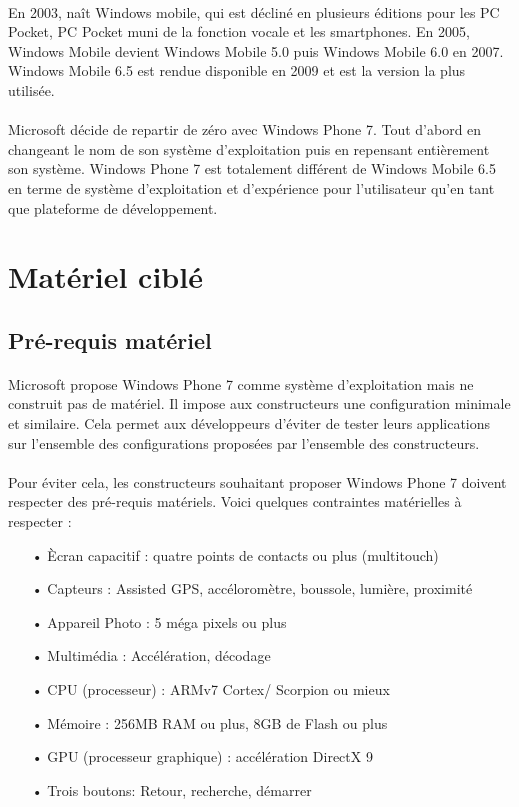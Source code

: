 \documentclass[twoside,UTF8]{EPURapport}
\begin{document}
\paragraph{}
En 2003, naît Windows mobile, qui est décliné en plusieurs éditions pour les PC Pocket, PC Pocket muni de la fonction vocale et les smartphones. En 2005, Windows Mobile devient Windows Mobile 5.0 puis Windows Mobile 6.0 en 2007. Windows Mobile 6.5 est rendue disponible en 2009 et est la version la plus utilisée. 

\paragraph{}
Microsoft décide de repartir de zéro avec Windows Phone 7. Tout d'abord en changeant le nom de son système d'exploitation puis en repensant entièrement son système. Windows Phone 7 est totalement différent de Windows Mobile 6.5 en terme de système d'exploitation et d'expérience pour l'utilisateur qu'en tant que plateforme de développement. 
 

\section{Matériel ciblé}
	\subsection{Pré-requis matériel}
\paragraph{}
Microsoft propose Windows Phone 7 comme système d'exploitation mais ne construit pas de matériel. Il impose aux constructeurs une configuration minimale et similaire. Cela permet aux développeurs d'éviter de tester leurs applications sur l'ensemble des configurations proposées par l'ensemble des constructeurs. 
\paragraph{}
Pour éviter cela, les constructeurs souhaitant proposer Windows Phone 7 doivent respecter des pré-requis matériels. 
Voici quelques contraintes matérielles à respecter : 
\begin{itemize}
	\item[•]\`Ecran capacitif : quatre points de contacts ou plus (multitouch)
	\item[•]Capteurs : Assisted GPS, accéloromètre, boussole, lumière, proximité
	\item[•]Appareil Photo : 5 méga pixels ou plus
	\item[•]Multimédia : Accélération, décodage
	\item[•]CPU (processeur) : ARMv7 Cortex/ Scorpion ou mieux
	\item[•]Mémoire : 256MB RAM ou plus, 8GB de Flash ou plus
	\item[•]GPU (processeur graphique) : accélération DirectX 9
	\item[•]Trois boutons: Retour, recherche, démarrer
\end{itemize}
\end{document}
